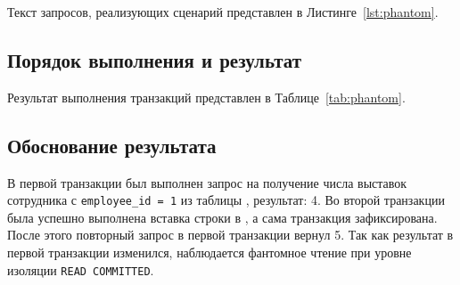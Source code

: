 Текст запросов, реализующих сценарий представлен в Листинге~\ref{lst:phantom}. \par

\vspace{8pt}



\subsection{Порядок выполнения и результат} \noindent

Результат выполнения транзакций представлен в Таблице~\ref{tab:phantom}. \par

\subsection{Обоснование результата} \noindent

В первой транзакции был выполнен запрос на получение числа выставок сотрудника с \texttt{employee\_id = 1} из таблицы \CuratorsTable{}, результат: 4.
Во второй транзакции была успешно выполнена вставка строки в \CuratorsTable{}, а сама транзакция зафиксирована. 
После этого повторный запрос в первой транзакции вернул 5. Так как результат в первой транзакции изменился, наблюдается фантомное чтение при уровне изоляции \texttt{READ COMMITTED}. \par


\clearpage
{}
\recalctypearea

